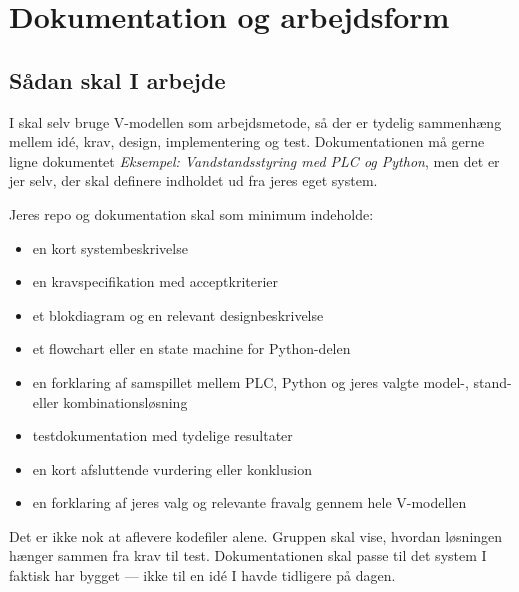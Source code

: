 \documentclass[12pt, a4paper]{article}
\begin{document}
\section{Dokumentation og arbejdsform}

\subsection{Sådan skal I arbejde}

I skal selv bruge V-modellen som arbejdsmetode, så der er tydelig sammenhæng
mellem idé, krav, design, implementering og test. Dokumentationen må gerne
ligne dokumentet \textit{Eksempel: Vandstandsstyring med PLC og Python}, men
det er jer selv, der skal definere indholdet ud fra jeres eget system.

\begin{tcolorbox}[defbox, title={\faCheckSquare\quad Det skal jeres materiale vise}]
Jeres repo og dokumentation skal som minimum indeholde:
\begin{itemize}[leftmargin=1.2em, itemsep=2pt]
  \item en kort systembeskrivelse
  \item en kravspecifikation med acceptkriterier
  \item et blokdiagram og en relevant designbeskrivelse
  \item et flowchart eller en state machine for Python-delen
  \item en forklaring af samspillet mellem PLC, Python og jeres valgte model-, stand- eller kombinationsløsning
  \item testdokumentation med tydelige resultater
  \item en kort afsluttende vurdering eller konklusion
  \item en forklaring af jeres valg og relevante fravalg gennem hele V-modellen
\end{itemize}
\end{tcolorbox}

\begin{tcolorbox}[warnbox, title={\faExclamationTriangle\quad Det her er vigtigt}]
Det er ikke nok at aflevere kodefiler alene. Gruppen skal vise, hvordan
løsningen hænger sammen fra krav til test. Dokumentationen skal passe til det
system I faktisk har bygget --- ikke til en idé I havde tidligere på dagen.
\end{tcolorbox}
\end{document}
